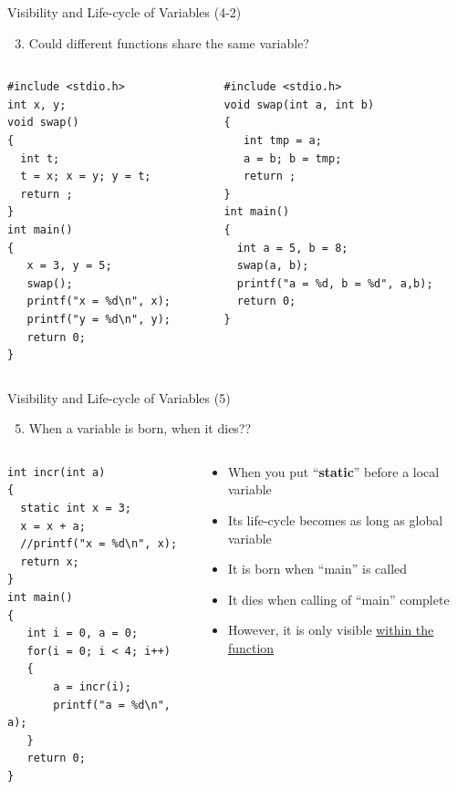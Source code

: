 \begin{frame}[fragile]{Visibility and Life-cycle of Variables (4-2)}
\begin{enumerate}
	\setcounter{enumi}{2}
	\item{Could different functions share the same variable?}
\end{enumerate}
\vspace{-0.15in}
\begin{columns}
\begin{column}{0.44\linewidth}
\begin{lstlisting}[xleftmargin=0.05\linewidth]
#include <stdio.h>
int x, y;
void swap()
{
  int t;
  t = x; x = y; y = t;
  return ;
}
int main()
{
   x = 3, y = 5;
   swap();
   printf("x = %d\n", x);
   printf("y = %d\n", y);
   return 0;
}
\end{lstlisting}
\end{column}
\begin{column}{0.54\linewidth}
\begin{lstlisting}[linewidth=0.98\linewidth]
#include <stdio.h>
void swap(int a, int b)
{
   int tmp = a;
   a = b; b = tmp;
   return ;
}
int main()
{
  int a = 5, b = 8;
  swap(a, b);
  printf("a = %d, b = %d", a,b);
  return 0;
}
\end{lstlisting}
\end{column}
\end{columns}
\end{frame}

\begin{frame}[fragile]{Visibility and Life-cycle of Variables (5)}
\begin{enumerate}
	\setcounter{enumi}{4}
		\item {When a variable is born, when it dies??}
\end{enumerate}
\begin{columns}
\begin{column}{0.55\linewidth}
\begin{lstlisting}[linewidth=0.9\linewidth, xleftmargin=0.02\linewidth]
int incr(int a)
{
  static int x = 3;
  x = x + a;
  //printf("x = %d\n", x);
  return x;
}
int main()
{
   int i = 0, a = 0;
   for(i = 0; i < 4; i++)
   {
       a = incr(i);
       printf("a = %d\n", a); 
   }
   return 0;
}
\end{lstlisting}
\end{column}
\begin{column}{0.44\linewidth}
\begin{itemize}
	\item {When you put ``\textbf{static}'' before a local variable}
	\item {Its life-cycle becomes as long as global variable}
	\item {It is born when ``main'' is called}
	\item {It dies when calling of ``main'' complete}
	\item {However, it is only visible \underline{within the function}}
\end{itemize}
\end{column}
\end{columns}
\end{frame}

